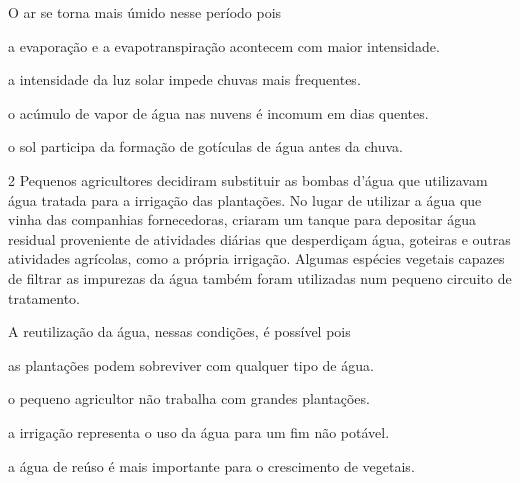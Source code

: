 O ar se torna mais úmido nesse período pois

\begin{escolha}
\item a evaporação e a evapotranspiração acontecem com maior intensidade.

\item a intensidade da luz solar impede chuvas mais frequentes.

\item o acúmulo de vapor de água nas nuvens é incomum em dias quentes.

\item o sol participa da formação de gotículas de água antes da chuva.
\end{escolha}


\num{2} Pequenos agricultores decidiram substituir as bombas d'água
que utilizavam água tratada para a irrigação das plantações. No lugar de
utilizar a água que vinha das companhias fornecedoras, criaram um tanque
para depositar água residual proveniente de atividades diárias que
desperdiçam água, goteiras e outras atividades agrícolas, como a própria
irrigação. Algumas espécies vegetais capazes de filtrar as impurezas da
água também foram utilizadas num pequeno circuito de tratamento.

A reutilização da água, nessas condições, é possível pois

\begin{escolha}
\item as plantações podem sobreviver com qualquer tipo de água.

\item o pequeno agricultor não trabalha com grandes plantações.

\item a irrigação representa o uso da água para um fim não potável.

\item a água de reúso é mais importante para o crescimento de vegetais.
\end{escolha}

